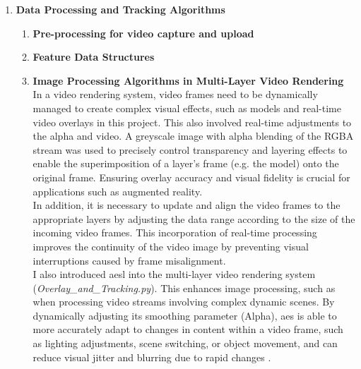 \documentclass[12pt]{article}
\begin{document}
\begin{enumerate}
      \item \textbf{Data Processing and Tracking Algorithms}
            \begin{enumerate}
                  \item \textbf{Pre-processing for video capture and upload}

                  \item \textbf{Feature Data Structures}

                  \item \textbf{Image Processing Algorithms in Multi-Layer Video Rendering}
                        \\ In a video rendering system, video frames need to be dynamically managed to create complex visual effects, such as models and real-time video overlays in this project. This also involved real-time adjustments to the \gls{alpha}\cite{Alpha} and video. A greyscale image with alpha blending of the RGBA stream was used to precisely control transparency and layering effects to enable the superimposition of a layer's frame (e.g. the model) onto the original frame\cite{9979846}. Ensuring overlay accuracy and visual fidelity is crucial for applications such as augmented reality\cite{SETTIMI2022104272}.
                        \\
                        In addition, it is necessary to update and align the video frames to the appropriate layers by adjusting the data range according to the size of the incoming video frames. This incorporation of real-time processing improves the continuity of the video image by preventing visual interruptions caused by frame misalignment\cite{Wang}.
                        \\
                        I also introduced \gls{aesl} into the multi-layer video rendering system (\emph{Overlay\_and\_Tracking.py}). This enhances image processing, such as when processing video streams involving complex dynamic scenes\cite{7410724}. By dynamically adjusting its smoothing parameter (Alpha), \gls{aes} is able to more accurately adapt to changes in content within a video frame, such as lighting adjustments, scene switching, or object movement, and can reduce visual jitter and blurring due to rapid changes \cite{7410724}.

\end{enumerate}
\end{enumerate}
\end{document}
